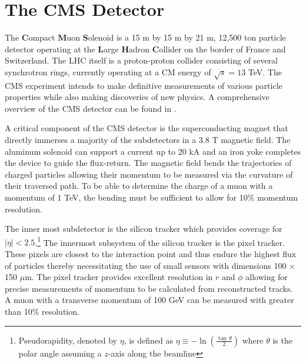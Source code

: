 \documentclass[a4paper,12pt]{article}
\begin{document}
\section{The CMS Detector}

    The \textbf{C}ompact \textbf{M}uon \textbf{S}olenoid is a 15 m by 15 m by 21
    m, 12,500 ton particle detector operating at the \textbf{L}arge \textbf{H}adron
    \textbf{C}ollider on the border of France and Switzerland. The LHC itself is a
    proton-proton collider consisting of several synchrotron rings, currently
    operating at a CM energy of $\sqrt{s} = 13$ TeV. The CMS experiment intends to 
    make definitive measurements of various particle properties while also making
    discoveries of new physics. A comprehensive overview of the CMS detector can be
    found in \cite{CMSTDR}.

    A critical component of the CMS detector is the superconducting magnet that
    directly immerses a majority of the subdetectors in a 3.8 T magnetic field.
    The aluminum solenoid can support a current up to 20 kA and an iron yoke
    completes the device to guide the flux-return.  The magnetic field bends the
    trajectories of charged particles allowing their momentum to be measured via
    the curvature of their traversed path. To be able to determine the charge of
    a muon with a momentum of 1 TeV, the bending must be sufficient to allow for
    10\% momentum resolution. 

    The inner most subdetector is the silicon tracker which provides coverage
    for $|\eta| < 2.5$.\footnote{Pseudorapidity, denoted by $\eta$, is defined
    as $\eta \equiv -\ln \left(\frac{\tan\,\theta}{2}\right)$ where $\theta$ is
    the polar angle assuming a $z$-axis along the beamline} The innermost
    subsystem of the silicon tracker is the pixel tracker. These pixels are
    closest to the interaction point and thus endure the highest flux of
    particles thereby necessitating the use of small sensors with dimensions 100
    $\times$ 150 $\mu$m. The pixel tracker provides excellent resolution in $r$
    and $\phi$ allowing for precise measurements of momentum to be calculated
    from reconstructed tracks. A muon with a transverse momentum of 100 GeV can
    be measured with greater than 10\% resolution. 
\end{document}
